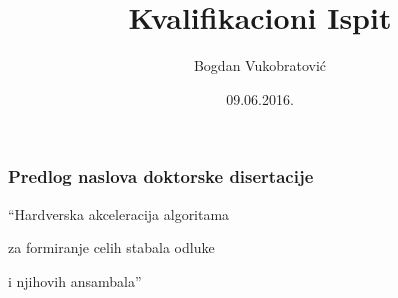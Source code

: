 \documentclass{beamer}
\title[Kvalifikacioni Ispit]{Kvalifikacioni Ispit} %
\author{Bogdan Vukobratović} %
\institute[FTN] %
{
Fakultet Tehničkih Nauka \\ %
\medskip
\textit{bogdan.vukobratovic@gmail.com} %
}
\date{09.06.2016.} %
\begin{document}
\begin{frame}
\titlepage %
\end{frame}





\begin{frame}
\frametitle{Predlog naslova doktorske disertacije}
\huge{\centerline{“Hardverska akceleracija algoritama}}
\huge{\centerline{za formiranje celih stabala odluke}}
\huge{\centerline{i njihovih ansambala”}}
\end{frame}

\end{document}
